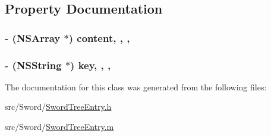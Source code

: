 \subsection{Property Documentation}
\hypertarget{interface_sword_tree_entry_a6fa535e66ba1bc8b90d69af605ef3290}{
\subsubsection[{content}]{\setlength{\rightskip}{0pt plus 5cm}-\/ (N\-S\-Array $\ast$) content\hspace{0.3cm}{\ttfamily [read]}, {\ttfamily [write]}, {\ttfamily [atomic]}, {\ttfamily [retain]}}}\label{interface_sword_tree_entry_a6fa535e66ba1bc8b90d69af605ef3290}
\hypertarget{interface_sword_tree_entry_a10a0815bfcf8afc08291f09bb4a0c086}{
\subsubsection[{key}]{\setlength{\rightskip}{0pt plus 5cm}-\/ (N\-S\-String $\ast$) key\hspace{0.3cm}{\ttfamily [read]}, {\ttfamily [write]}, {\ttfamily [atomic]}, {\ttfamily [retain]}}}\label{interface_sword_tree_entry_a10a0815bfcf8afc08291f09bb4a0c086}


The documentation for this class was generated from the following files\-:\begin{DoxyCompactItemize}
\item 
src/\-Sword/\hyperlink{_sword_tree_entry_8h}{Sword\-Tree\-Entry.\-h}\item 
src/\-Sword/\hyperlink{_sword_tree_entry_8m}{Sword\-Tree\-Entry.\-m}\end{DoxyCompactItemize}
